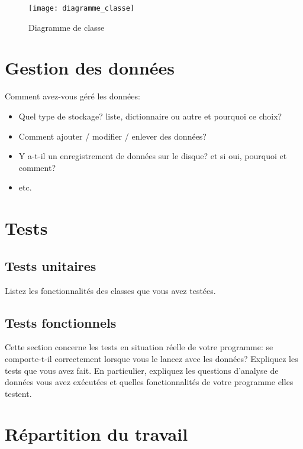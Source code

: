 \documentclass[11pt,a4paper]{article}
\begin{document}
\begin{figure}[tb]
  \centering
  \texttt{[image: diagramme\_classe]}
  \caption{Diagramme de classe}
  \label{fig:diagramme_classe}
\end{figure}

\section{Gestion des données}

Comment avez-vous géré les données: 
\begin{itemize}
    \item Quel type de stockage? liste, dictionnaire ou autre et pourquoi ce choix?
    \item Comment ajouter / modifier / enlever des données?
    \item Y a-t-il un enregistrement de données sur le disque? et si oui, pourquoi et comment?
    \item etc.
\end{itemize}

\section{Tests}

\subsection{Tests unitaires}

Listez les fonctionnalités des classes que vous avez testées.

\subsection{Tests fonctionnels}

Cette section concerne les tests en situation réelle de votre programme: se comporte-t-il correctement lorsque vous le lancez avec les données?
Expliquez les tests que vous avez fait.
En particulier, expliquez les questions d'analyse de données vous avez exécutées et quelles fonctionnalités de votre programme elles testent.

% 

\section{Répartition du travail}
\end{document}

